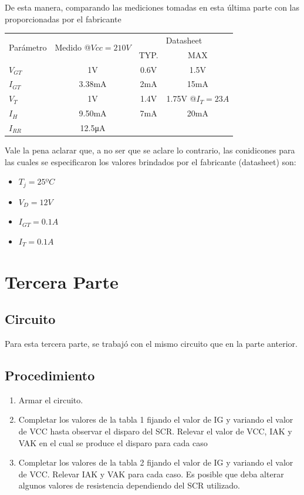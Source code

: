 De esta manera, comparando las mediciones tomadas en esta última parte con las proporcionadas por el fabricante
\begin{table}[H]
  \begin{center}
    \begin{tabular}{l|c|c|c}
      \multirow{2}{*}{Parámetro} &\multirow{2}{*}{Medido @$Vcc=210V$}  &\multicolumn{2}{c}{Datasheet}  \\
      \cline{3-4}
                &  &TYP. &MAX  \\
      \hline
      $V_{GT}$  &1V      &0.6V   &1.5V  \\
      $I_{GT}$  &3.38mA  &2mA   &15mA  \\
      $V_{T}$   &1V      &1.4V   &1.75V @$I_T=23A$  \\
      $I_{H}$   &9.50mA  &7mA   &20mA  \\
      $I_{RR}$  &12.5\unit{\micro\ampere} & &
    \end{tabular}
  \end{center} 
\end{table}
Vale la pena aclarar que, a no ser que se aclare lo contrario, las conidicones para las cuales se especificaron los 
valores brindados por el fabricante (datasheet) son:
\begin{itemize}
  \item $T_j=25ºC$ 
  \item $V_D=12V$ 
  \item $I_{GT}=0.1A$ 
  \item $I_{T}=0.1A$ 
\end{itemize}

\section{Tercera Parte}
\subsection{Circuito}
Para esta tercera parte, se trabajó con el mismo circuito que en la parte anterior.
\subsection{Procedimiento}
\begin{enumerate}
  \item Armar el circuito.
  \item Completar los valores de la tabla 1 fijando el valor de IG y variando el valor
    de VCC hasta observar el disparo del SCR. Relevar el valor de VCC, IAK y VAK
    en el cual se produce el disparo para cada caso 
  \item Completar los valores de la tabla 2 fijando el valor de IG y variando el valor
    de VCC. Relevar IAK y VAK para cada caso. Es posible que deba alterar
    algunos valores de resistencia dependiendo del SCR utilizado.
\end{enumerate}

